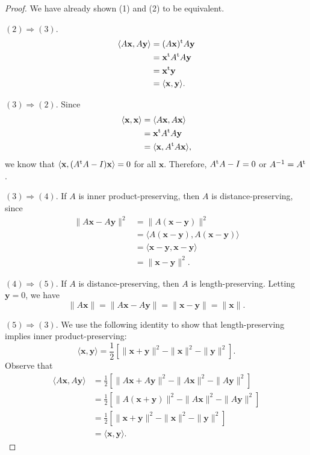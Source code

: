  
\begin{proof}
We have already shown (1) and (2) to be equivalent.
 
$(2) \Rightarrow (3)$.
\begin{align*}
\langle A{\mathbf x}, A{\mathbf y} \rangle
& =
(A {\mathbf x})^{\rm t} A {\mathbf y} \\
& =
{\mathbf x}^{\rm t} A^{\rm t} A {\mathbf y} \\
& =
{\mathbf x}^{\rm t} {\mathbf y} \\
& =
\langle {\mathbf x}, {\mathbf y} \rangle.
\end{align*}
 
$(3) \Rightarrow (2)$.
Since
\begin{align*}
\langle {\mathbf x}, {\mathbf x} \rangle
& =
\langle A{\mathbf x}, A{\mathbf x} \rangle \\
& =
{\mathbf x}^{\rm t} A^{\rm t} A {\mathbf y} \\
& =
\langle {\mathbf x}, A^{\rm t} A{\mathbf x} \rangle,
\end{align*}
we know that $\langle {\mathbf x}, (A^{\rm t} A - I){\mathbf x} \rangle =
0$ for all ${\mathbf x}$.  Therefore, $A^{\rm t} A -I = 0$ or $A^{-1} =
A^{\rm t}$. 
 
 
$(3) \Rightarrow (4)$.
If $A$ is inner product-preserving, then $A$ is distance-preserving,
since 
\begin{align*}
\| A{\mathbf x} - A{\mathbf y} \|^2
& =
\| A({\mathbf x} - {\mathbf y}) \|^2 \\
& =
\langle
A({\mathbf x} - {\mathbf y}), A({\mathbf x} - {\mathbf y})
\rangle \\
& =
\langle
{\mathbf x} - {\mathbf y}, {\mathbf x} - {\mathbf y}
\rangle \\
& =
\| {\mathbf x} - {\mathbf y} \|^2.
\end{align*}
 
 
$(4) \Rightarrow (5)$.
If $A$ is distance-preserving, then $A$ is length-preserving. Letting
${\mathbf y} = 0$, we have
\[
\| A{\mathbf x}\|
= \| A{\mathbf x}- A{\mathbf y} \|
= \| {\mathbf x}- {\mathbf y} \|
= \| {\mathbf x} \|.
\]
 
 
$(5) \Rightarrow (3)$.
We use the following identity to show that length-preserving implies
inner product-preserving: 
\[
\langle {\mathbf x}, {\mathbf y} \rangle
=
\frac{1}{2}
\left[
\|{\mathbf x} +{\mathbf y}\|^2 -
 \|{\mathbf x}\|^2 - \|{\mathbf y}\|^2
\right].
\]
Observe that
\begin{align*}
\langle A {\mathbf x}, A {\mathbf y} \rangle
& =
\frac{1}{2}
\left[
\|A {\mathbf x} + A {\mathbf y} \|^2
- \|A {\mathbf x} \|^2 -  \|A {\mathbf y} \|^2
\right] \\
& =
\frac{1}{2}
\left[
\|A ( {\mathbf x} + {\mathbf y} ) \|^2
- \|A {\mathbf x} \|^2 -  \|A {\mathbf y} \|^2
\right] \\
& =
\frac{1}{2}
\left[
\|{\mathbf x} + {\mathbf y}\|^2
- \|{\mathbf x}\|^2 - \|{\mathbf y}\|^2
\right] \\
& =
\langle {\mathbf x}, {\mathbf y} \rangle.
\end{align*}
\end{proof}
 


